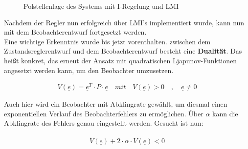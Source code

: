 \begin{figure}[H]
    \centering
    \caption[Polstellen Regler mit LMI]{Polstellenlage des Systems mit I-Regelung und LMI}
    \label{fig:Bild45}
\end{figure}

Nachdem der Regler nun erfolgreich über LMI's implementiert wurde, kann nun mit dem Beobachterentwurf fortgesetzt werden.\\
Eine wichtige Erkenntnis wurde bis jetzt vorenthalten. zwischen dem Zustandsreglerentwurf und dem Beobachterentwurf besteht eine \textbf{Dualität}. Das heißt konkret, das erneut der Ansatz mit quadratischen Ljapunov-Funktionen angesetzt werden kann, um den Beobachter umzusetzen.

\begin{align}
    V(\underline{e}) = \underline{e}^T \cdot P \cdot \underline{e} \quad mit \quad V(\underline{e}) > 0 \quad , \quad \underline{e} \neq 0 
\end{align}

Auch hier wird ein Beobachter mit Abklingrate gewählt, um diesmal einen exponentiellen Verlauf des Beobachterfehlers zu ermöglichen. Über $\alpha$ kann die Abklingrate des Fehlers genau eingestellt werden. Gesucht ist nun:

\begin{align}
    \dot{V}(\underline{e}) + 2 \cdot \alpha \cdot V(\underline{e}) < 0
\end{align}


